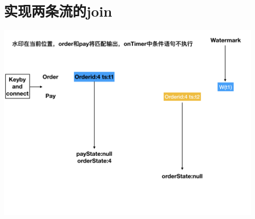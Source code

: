 \documentclass[oneside]{ctexbook}
\begin{document}
\section{实现两条流的join}

\noindent \includegraphics[width=\textwidth]{twostreamsjoin.png}
\end{document}
